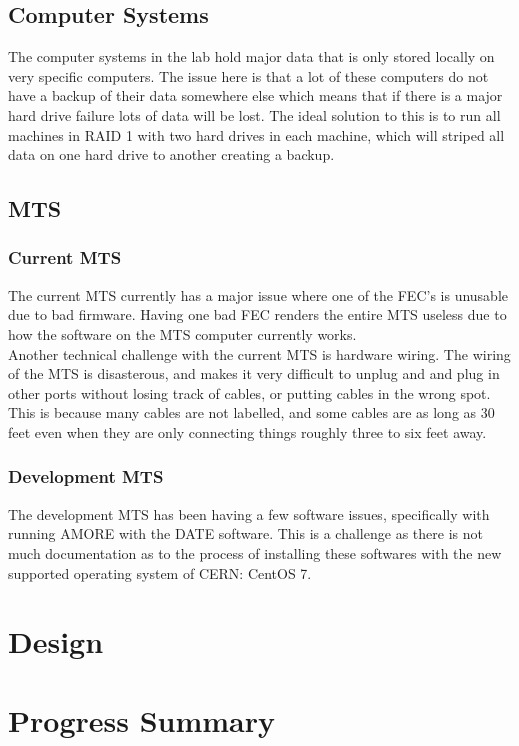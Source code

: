 \documentclass[12pt]{article}
\newcommand\tab[1][1cm]{\hspace*{#1}}
\begin{document}
\subsection{Computer Systems}
\tab The computer systems in the lab hold major data that is only stored locally on very specific computers. The issue here is that a lot of these computers do not have a backup of their data somewhere else which means that if there is a major hard drive failure lots of data will be lost. The ideal solution to this is to run all machines in RAID 1 with two hard drives in each machine, which will striped all data on one hard drive to another creating a backup. 
\subsection{MTS}
\subsubsection{Current MTS}
\tab The current MTS currently has a major issue where one of the FEC's is unusable due to bad firmware. Having one bad FEC renders the entire MTS useless due to how the software on the MTS computer currently works. \\
\tab Another technical challenge with the current MTS is hardware wiring. The wiring of the MTS is disasterous, and makes it very difficult to unplug and and plug in other ports without losing track of cables, or putting cables in the wrong spot. This is because many cables are not labelled, and some cables are as long as 30 feet even when they are only connecting things roughly three to six feet away.
\subsubsection{Development MTS}
\tab The development MTS has been having a few software issues, specifically with running AMORE with the DATE software. This is a challenge as there is not much documentation as to the process of installing these softwares with the new supported operating system of CERN: CentOS 7.
 
\section{Design}

\section{Progress Summary}
\end{document}
